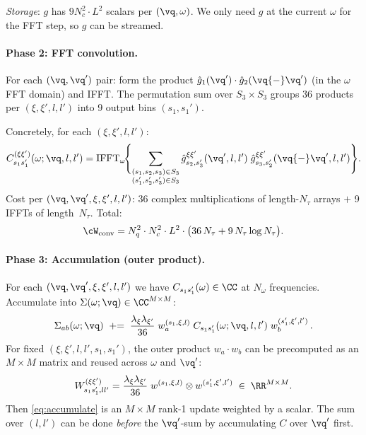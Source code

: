 \emph{Storage}: $g$ has $9 N_c^2 \cdot L^2$ scalars per
$(\vq, \omega)$.  We only need $g$ at the current $\omega$
for the FFT step, so $g$ can be streamed.

\paragraph{Phase 2: FFT convolution.}

For each $(\vq, \vq')$ pair: form the product
$\hat{g}_1(\vq') \cdot \hat{g}_2(\vq{-}\vq')$ (in the $\omega$
FFT domain) and IFFT.  The permutation sum over $S_3 \times S_3$
groups 36 products per $(\xi,\xi',l,l')$ into 9 output bins
$(s_1, s_1')$.

Concretely, for each $(\xi, \xi', l, l')$:
\begin{equation}
  C^{(\xi\xi')}_{s_1 s_1'}(\omega; \vq, l, l')
  = \mathrm{IFFT}_\omega\!\Biggl\{
    \sum_{\substack{(s_1,s_2,s_3)\in S_3\\(s_1',s_2',s_3')\in S_3}}
    \hat g_{s_2,s_3'}^{\xi\xi'}(\vq',l,l')\;
    \hat g_{s_3,s_2'}^{\xi\xi'}(\vq{-}\vq',l,l')
  \Biggr\}.
\end{equation}
Cost per $(\vq, \vq', \xi, \xi', l, l')$:
36 complex multiplications of length-$N_\tau$ arrays $+$
9 IFFTs of length~$N_\tau$.
Total:
\begin{equation}\label{eq:cost_conv}
  \cW_\mathrm{conv}
  = N_q^2 \cdot N_c^2 \cdot L^2 \cdot
    \bigl(36\, N_\tau + 9\, N_\tau \log N_\tau\bigr).
\end{equation}

\paragraph{Phase 3: Accumulation (outer product).}

For each $(\vq, \vq', \xi, \xi', l, l')$ we have
$C_{s_1 s_1'}(\omega) \in \CC$ at $N_\omega$ frequencies.
Accumulate into $\Sigma(\omega;\vq) \in \CC^{M \times M}$:
\begin{equation}\label{eq:accumulate}
  \Sigma_{ab}(\omega;\vq)
  \;\mathrel{+}=\;
  \frac{\lambda_\xi\lambda_{\xi'}}{36}\;
  w_a^{(s_1,\xi,l)}\;
  C_{s_1 s_1'}(\omega;\vq,l,l')\;
  w_b^{(s_1',\xi',l')}\,.
\end{equation}
For fixed $(\xi, \xi', l, l', s_1, s_1')$, the outer product
$w_a \cdot w_b$ can be precomputed as an $M \times M$ matrix and
reused across $\omega$ and $\vq'$:
\begin{equation}
  W^{(\xi\xi')}_{s_1 s_1', l l'}
  = \frac{\lambda_\xi\lambda_{\xi'}}{36}\;
    w^{(s_1,\xi,l)} \otimes w^{(s_1',\xi',l')}
  \;\in\; \RR^{M \times M}.
\end{equation}
Then \cref{eq:accumulate} is an $M \times M$ rank-1 update weighted
by a scalar.  The sum over $(l, l')$ can be done \emph{before}
the $\vq'$-sum by accumulating $C$ over $\vq'$ first.

